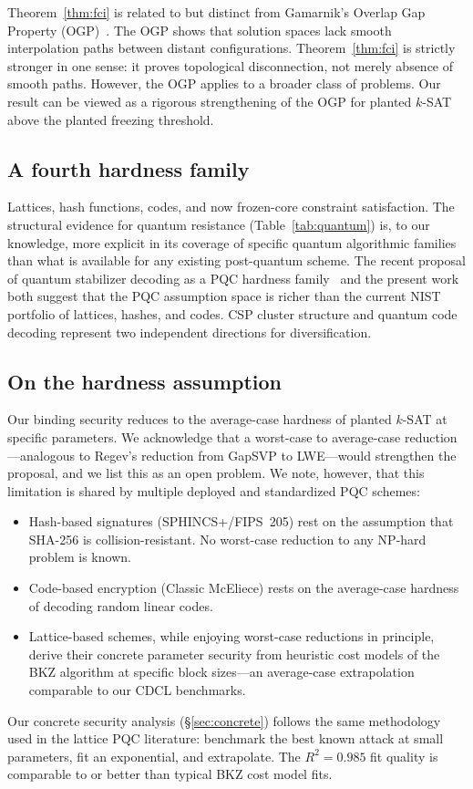 \documentclass[11pt]{article}
\begin{document}
Theorem~\ref{thm:fci} is related to but distinct from Gamarnik's Overlap Gap Property (OGP)~\cite{Gam21}.  The OGP shows that solution spaces lack smooth interpolation paths between distant configurations.  Theorem~\ref{thm:fci} is strictly stronger in one sense: it proves topological disconnection, not merely absence of smooth paths.  However, the OGP applies to a broader class of problems.  Our result can be viewed as a rigorous strengthening of the OGP for planted $k$-SAT above the planted freezing threshold.


\subsection{A fourth hardness family}

Lattices, hash functions, codes, and now frozen-core constraint satisfaction.  The structural evidence for quantum resistance (Table~\ref{tab:quantum}) is, to our knowledge, more explicit in its coverage of specific quantum algorithmic families than what is available for any existing post-quantum scheme.  The recent proposal of quantum stabilizer decoding as a PQC hardness family~\cite{LPQR26} and the present work both suggest that the PQC assumption space is richer than the current NIST portfolio of lattices, hashes, and codes.  CSP cluster structure and quantum code decoding represent two independent directions for diversification.


\subsection{On the hardness assumption}

Our binding security reduces to the average-case hardness of planted $k$-SAT at specific parameters.  We acknowledge that a worst-case to average-case reduction---analogous to Regev's reduction from GapSVP to LWE---would strengthen the proposal, and we list this as an open problem.  We note, however, that this limitation is shared by multiple deployed and standardized PQC schemes:
\begin{itemize}
\item Hash-based signatures (SPHINCS+/FIPS~205) rest on the assumption that SHA-256 is collision-resistant.  No worst-case reduction to any NP-hard problem is known.
\item Code-based encryption (Classic McEliece) rests on the average-case hardness of decoding random linear codes.
\item Lattice-based schemes, while enjoying worst-case reductions in principle, derive their concrete parameter security from heuristic cost models of the BKZ algorithm at specific block sizes---an average-case extrapolation comparable to our CDCL benchmarks.
\end{itemize}
Our concrete security analysis (\S\ref{sec:concrete}) follows the same methodology used in the lattice PQC literature: benchmark the best known attack at small parameters, fit an exponential, and extrapolate.  The $R^2 = 0.985$ fit quality is comparable to or better than typical BKZ cost model fits.
\end{document}
